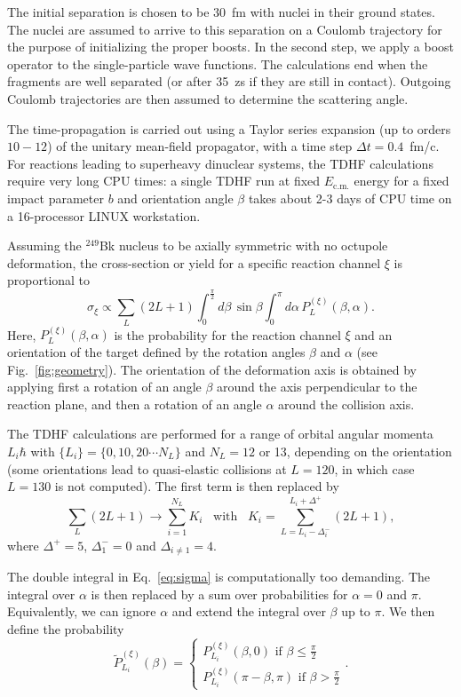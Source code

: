 The initial separation is chosen to be $30$~fm
with nuclei in their ground states. The nuclei are assumed to arrive
to this separation on a Coulomb trajectory for the purpose of initializing
the proper boosts.
In the second
step, we apply a boost operator to the single-particle wave functions.
The calculations end when the fragments are well separated (or after 35~zs if they are still in contact). Outgoing Coulomb trajectories are then assumed to determine the scattering angle.

The time-propagation
is carried out using a Taylor series expansion (up to orders $10-12$) of the
unitary mean-field propagator, with a time step $\Delta t = 0.4$~fm/c.
For reactions leading to superheavy dinuclear systems, the TDHF calculations
require very long CPU times: a single TDHF run at fixed $E_\mathrm{c.m.}$ energy
for a fixed impact parameter $b$ and orientation angle $\beta$ takes about 2-3 days of CPU time
on a 16-processor LINUX workstation.

Assuming the $^{249}$Bk nucleus to be axially symmetric with no octupole deformation, the cross-section or yield for a specific reaction channel $\xi$ is proportional to
\begin{equation}
\sigma_\xi\propto \sum_L (2L+1) \int_0^{\frac{\pi}{2}} d\beta \,\sin\beta \int_0^\pi d\alpha \,P_L^{(\xi)}(\beta,\alpha). \label{eq:sigma}
\end{equation}
Here, $P_L^{(\xi)}(\beta,\alpha)$ is the probability for the reaction channel $\xi$ and an orientation of the target defined by the rotation angles $\beta$ and $\alpha$ (see Fig.~\ref{fig:geometry}).
The orientation of the deformation axis is obtained by applying first a rotation of an angle $\beta$ around the axis perpendicular to the reaction plane, and then a rotation of an angle $\alpha$ around the collision axis.

The TDHF calculations are performed for a range of orbital angular momenta $L_i\hbar$ with $\{L_i\}=\{0,10,20\cdots N_L\}$ and $N_L=12$ or 13, depending on the orientation (some orientations lead to quasi-elastic collisions at $L=120$, in which case $L=130$ is not computed).
The first term is then replaced by $$\sum_L (2L+1) \rightarrow \sum_{i=1}^{N_L}K_i \,\,\,\mbox{~with~} \,\,\,
K_i=\sum_{L=L_i-\Delta_i^-}^{L_i+\Delta^+}(2L+1),$$
where $\Delta^+=5$, $\Delta_1^-=0$ and $\Delta_{i\ne 1}=4$.

The double integral in Eq.~\eqref{eq:sigma} is computationally too demanding.
The integral over $\alpha$ is then replaced by a sum over probabilities for $\alpha=0$ and $\pi$.
Equivalently, we can ignore $\alpha$ and extend the integral over $\beta$ up to $\pi$.
We then define the probability
$$\tilde{P}_{L_i}^{(\xi)}(\beta) = \begin{cases} P_{L_i}^{(\xi)}(\beta,0)\mbox{~if~}\beta\le\frac{\pi}{2}\\
P_{L_i}^{(\xi)}(\pi-\beta,\pi)\mbox{~if~}\beta > \frac{\pi}{2}\end{cases}.$$\\

